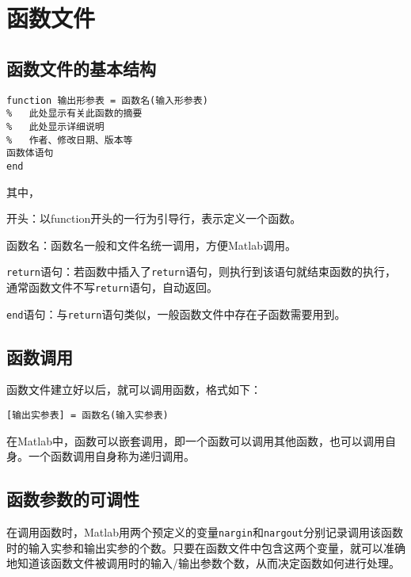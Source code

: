 \section{函数文件}
\subsection{函数文件的基本结构}
\begin{lstlisting}
function 输出形参表 = 函数名(输入形参表)
%	此处显示有关此函数的摘要
%	此处显示详细说明
%	作者、修改日期、版本等
函数体语句
end
\end{lstlisting}
其中，
\begin{myitemize}
\item 开头：以function开头的一行为引导行，表示定义一个函数。
\item 函数名：函数名一般和文件名统一调用，方便Matlab调用。
\item \lstinline|return|语句：若函数中插入了\lstinline|return|语句，则执行到该语句就结束函数的执行，通常函数文件不写\lstinline|return|语句，自动返回。
\item \lstinline|end|语句：与\lstinline|return|语句类似，一般函数文件中存在子函数需要用到。\vspace*{0.3em}
\end{myitemize}
\vspace*{0.5em}
\subsection{函数调用}
函数文件建立好以后，就可以调用函数，格式如下：
\begin{center}
	\lstinline|[输出实参表] = 函数名(输入实参表)|
\end{center}

在Matlab中，函数可以嵌套调用，即一个函数可以调用其他函数，也可以调用自身。一个函数调用自身称为递归调用。
\vspace*{0.5em}
\subsection{函数参数的可调性}
在调用函数时，Matlab用两个预定义的变量\lstinline|nargin|和\lstinline|nargout|分别记录调用该函数时的输入实参和输出实参的个数。只要在函数文件中包含这两个变量，就可以准确地知道该函数文件被调用时的输入/输出参数个数，从而决定函数如何进行处理。

